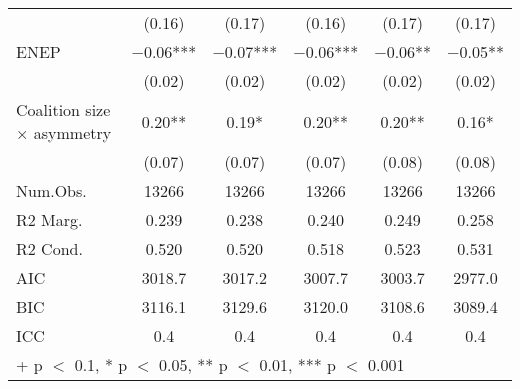 \begin{longtable}{lccccc}
& (\num{0.16})   & (\num{0.17})   & (\num{0.16})   & (\num{0.17})   & (\num{0.17})   \\
ENEP                                    & \num{-0.06}*** & \num{-0.07}*** & \num{-0.06}*** & \num{-0.06}**  & \num{-0.05}**  \\
& (\num{0.02})   & (\num{0.02})   & (\num{0.02})   & (\num{0.02})   & (\num{0.02})   \\
Coalition size × asymmetry              & \num{0.20}**   & \num{0.19}*    & \num{0.20}**   & \num{0.20}**   & \num{0.16}*    \\
& (\num{0.07})   & (\num{0.07})   & (\num{0.07})   & (\num{0.08})   & (\num{0.08})   \\
\midrule
Num.Obs.                                & \num{13266}    & \num{13266}    & \num{13266}    & \num{13266}    & \num{13266}    \\
R2 Marg.                                & \num{0.239}    & \num{0.238}    & \num{0.240}    & \num{0.249}    & \num{0.258}    \\
R2 Cond.                                & \num{0.520}    & \num{0.520}    & \num{0.518}    & \num{0.523}    & \num{0.531}    \\
AIC                                     & \num{3018.7}   & \num{3017.2}   & \num{3007.7}   & \num{3003.7}   & \num{2977.0}   \\
BIC                                     & \num{3116.1}   & \num{3129.6}   & \num{3120.0}   & \num{3108.6}   & \num{3089.4}   \\
ICC                                     & \num{0.4}      & \num{0.4}      & \num{0.4}      & \num{0.4}      & \num{0.4}      \\
\bottomrule
\multicolumn{6}{l}{\rule{0pt}{1em}+ p $<$ 0.1, * p $<$ 0.05, ** p $<$ 0.01, *** p $<$ 0.001}\\
\end{longtable}
